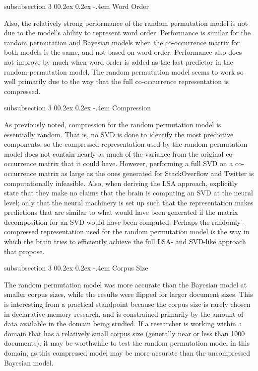 \documentclass[man,floatsintext,donotrepeattitle]{apa6}
\makeatletter
\renewcommand{\subsubsection}{%
  \@startsection
  {subsubsection}%
  {3}%
  {\parindent}%
  {0\baselineskip \@plus 0.2ex \@minus 0.2ex}%
  {-.4em}%
  {\normalfont\normalsize\bfseries\addperi}}
\makeatother
\begin{document}
\subsubsection{Word Order}

Also, the relatively strong performance of the random permutation model is not due to the model's ability to represent word order.
Performance is similar for the random permutation and Bayesian models when the co-occurrence matrix for both models is the same, and not based on word order.
Performance also does not improve by much when word order is added as the last predictor in the random permutation model.
The random permutation model seems to work so well primarily due to the way that the full co-occurrence representation is compressed.

\subsubsection{Compression}

As previously noted, compression for the random permutation model is essentially random.
That is, no SVD is done to identify the most predictive components,
so the compressed representation used by the random permutation model does not contain nearly as much of the variance from the original co-occurrence matrix that it could have.
However, performing a full SVD on a co-occurrence matrix as large as the ones generated for StackOverflow and Twitter is computationally infeasible.
Also, when deriving the LSA approach, \textcite{Landauer1997} explicitly state that they make no claims that the brain is computing an SVD at the neural level;
only that the neural machinery is set up such that the representation makes predictions that are similar to what would have been generated if the matrix decomposition for an SVD would have been computed.
Perhaps the randomly-compressed representation used for the random permutation model is the way in which the brain tries to efficiently achieve the full LSA- and SVD-like approach that \citeauthor{Landauer1997} propose.

\subsubsection{Corpus Size}

The random permutation model was more accurate than the Bayesian model at smaller corpus sizes, while the results were flipped for larger document sizes.
This is interesting from a practical standpoint because the corpus size is rarely chosen in declarative memory research, and is constrained primarily by the amount of data available in the domain being studied.
If a researcher is working within a domain that has a relatively small corpus size (generally near or less than \num{1000} documents),
it may be worthwhile to test the random permutation model in this domain, as this compressed model may be more accurate than the uncompressed Bayesian model.
\end{document}
